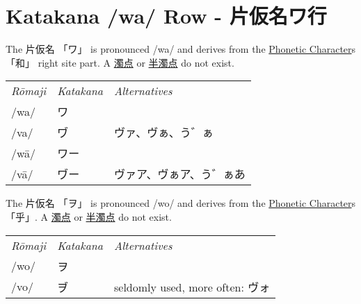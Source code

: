 \section{Katakana /wa/ Row - 片仮名ワ行}\label{sec:KatakanaWaRow}


\label{letter:wa} The 片仮名 {「ワ」} is pronounced  /wa/ and
derives from the \hyperref[sec:PhoneticCharacter]{Phonetic Character}s {「和」}
right site part.  A \hyperref[sec:Dakuten]{濁点}  or
\hyperref[sec:Handakuten]{半濁点} do not exist.


\begin{center}\begin{tabular}{lll}
\textit{Rōmaji}&\textit{Katakana}&\textit{Alternatives}\\
/wa/&ワ  &\\
/va/&ヷ  &\small ヴァ、ヴぁ、う゛ぁ\\
/wā/&ワー&\\
/vā/&ヷー&\small ヴァア、ヴぁア、う゛ぁあ\\
\end{tabular}\end{center}


\label{letter:wo} The 片仮名 {「ヲ」} is pronounced  /wo/ and
derives from the \hyperref[sec:PhoneticCharacter]{Phonetic Character}s
{「乎」}.  A \hyperref[sec:Dakuten]{濁点}  or \hyperref[sec:Handakuten]{半濁点}
do not exist.

\begin{center}\begin{tabular}{lll}
\textit{Rōmaji}&\textit{Katakana}&\textit{Alternatives}\\
/wo/&ヲ  &\\
/vo/&ヺ  &seldomly used, more often: ヴォ\\
\end{tabular}\end{center}


\newpage





